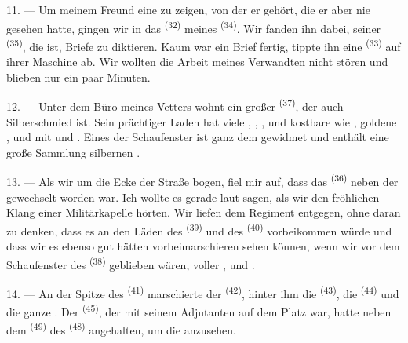 \VUsaut{3.0mm}

11. --- Um meinem Freund eine  zu zeigen, von der er gehört,
die er aber nie gesehen hatte, gingen wir in das  \textsuperscript{(32)}
meines  \textsuperscript{(34)}. Wir fanden ihn dabei, seiner
 \textsuperscript{(35)}, die  ist, Briefe zu
diktieren. Kaum war ein Brief fertig, tippte ihn eine 
\textsuperscript{(33)} auf ihrer Maschine ab. Wir wollten die Arbeit meines
Verwandten nicht stören und blieben nur ein paar Minuten.

12. --- Unter dem Büro meines Vetters wohnt ein großer
 \textsuperscript{(37)}, der auch Silberschmied ist.
Sein prächtiger Laden hat viele , ,
,  und kostbare  wie
, goldene ,  und
 mit  und . Eines der
Schaufenster ist ganz dem  gewidmet und enthält eine große
Sammlung silbernen .

13. --- Als wir um die Ecke der Straße bogen, fiel mir auf, dass das
 \textsuperscript{(36)} neben der 
gewechselt worden war. Ich wollte es gerade laut sagen, als wir den fröhlichen Klang
einer Militärkapelle hörten. Wir liefen dem Regiment entgegen, ohne daran zu denken,
dass es an den Läden des  \textsuperscript{(39)} und des
 \textsuperscript{(40)} vorbeikommen würde und dass wir es
ebenso gut hätten vorbeimarschieren sehen können, wenn wir vor dem Schaufenster des
 \textsuperscript{(38)} geblieben wären, voller ,
 und .

\VUsaut{3.0mm}

14. --- An der Spitze des  \textsuperscript{(41)} marschierte der
 \textsuperscript{(42)}, hinter ihm die 
\textsuperscript{(43)}, die  \textsuperscript{(44)} und die ganze
. Der  \textsuperscript{(45)}, der mit seinem
Adjutanten auf dem Platz war, hatte neben dem 
\textsuperscript{(49)} des  \textsuperscript{(48)} angehalten,
um die  anzusehen.


